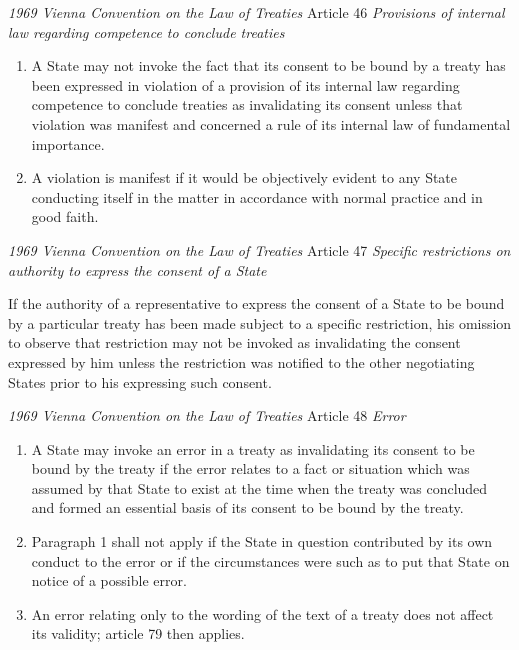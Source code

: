 \begin{conventiondetails}{\textit{1969 Vienna Convention on the Law of Treaties} Article 46}
    \flushleft
    \textit{Provisions of internal law regarding competence to conclude treaties}

    \begin{enumerate}
        \item A State may not invoke the fact that its consent to be bound by a treaty has been expressed in violation of a provision of its internal law regarding competence to conclude treaties as invalidating its consent unless that violation was manifest and concerned a rule of its internal law of fundamental importance. 
        \item A violation is manifest if it would be objectively evident to any State conducting itself in the matter in accordance with normal practice and in good faith.
    \end{enumerate}
\end{conventiondetails}

\begin{conventiondetails}{\textit{1969 Vienna Convention on the Law of Treaties} Article 47}
    \flushleft
    \textit{Specific restrictions on authority to express the consent of a State}

    \vspace{\baselineskip}

    If the authority of a representative to express the consent of a State to be bound by a particular treaty has been made subject to a specific restriction, his omission to observe that restriction may not be invoked as invalidating the consent expressed by him unless the restriction was notified to the other negotiating States prior to his expressing such consent.
\end{conventiondetails}

\begin{conventiondetails}{\textit{1969 Vienna Convention on the Law of Treaties} Article 48}
    \flushleft
    \textit{Error}

    \begin{enumerate}
        \item A State may invoke an error in a treaty as invalidating its consent to be bound by the treaty if the error relates to a fact or situation which was assumed by that State to exist at the time when the treaty was concluded and formed an essential basis of its consent to be bound by the treaty. 
        \item Paragraph 1 shall not apply if the State in question contributed by its own conduct to the error or if the circumstances were such as to put that State on notice of a possible error. 
        \item An error relating only to the wording of the text of a treaty does not affect its validity; article 79 then applies.
    \end{enumerate}
\end{conventiondetails}

